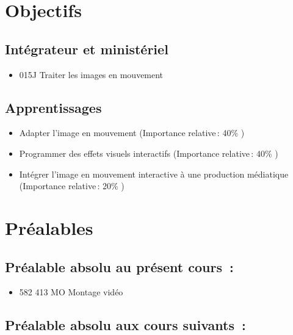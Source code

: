 \documentclass[
]{book}
\providecommand{\tightlist}{%
  \setlength{\itemsep}{0pt}\setlength{\parskip}{0pt}}
\begin{document}
\hypertarget{objectifs}{%
\section{Objectifs}\label{objectifs}}

\hypertarget{intuxe9grateur-et-ministuxe9riel}{%
\subsection{Intégrateur et ministériel}\label{intuxe9grateur-et-ministuxe9riel}}

\begin{itemize}
\tightlist
\item
  015J Traiter les images en mouvement
\end{itemize}

\hypertarget{apprentissages}{%
\subsection{Apprentissages}\label{apprentissages}}

\begin{itemize}
\tightlist
\item
  Adapter l'image en mouvement (Importance relative\,: 40\% )
\item
  Programmer des effets visuels interactifs (Importance relative\,: 40\% )
\item
  Intégrer l'image en mouvement interactive à une production médiatique (Importance relative\,: 20\% )
\end{itemize}

\hypertarget{pruxe9alables}{%
\section{Préalables}\label{pruxe9alables}}

\hypertarget{pruxe9alable-absolu-au-pruxe9sent-cours}{%
\subsection{Préalable absolu au présent cours~:}\label{pruxe9alable-absolu-au-pruxe9sent-cours}}

\begin{itemize}
\tightlist
\item
  582 413 MO Montage vidéo
\end{itemize}

\hypertarget{pruxe9alable-absolu-aux-cours-suivants}{%
\subsection{Préalable absolu aux cours suivants~:}\label{pruxe9alable-absolu-aux-cours-suivants}}
\end{document}
